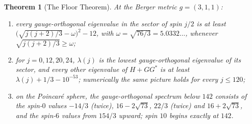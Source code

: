 \documentclass[11pt]{article}
\newtheorem{theorem}{Theorem}[section]
\theoremstyle{definition}
\theoremstyle{remark}
\begin{document}
\begin{theorem}[The Floor Theorem]\label{thm:gap}
At the Berger metric $g=(3,1,1)$:
\begin{enumerate}
  \item every gauge-orthogonal eigenvalue in the sector of spin $j/2$ is at least
    $\bigl(\sqrt{j(j+2)/3}-\omega\bigr)^2-12$, with $\omega=\sqrt{76/3}=5.0332\ldots$, whenever
    $\sqrt{j(j+2)/3}\ge\omega$;
  \item for $j=0,12,20,24$, $\lambda(j)$ is the lowest gauge-orthogonal eigenvalue of its sector, and
    every other eigenvalue of $H+GG^*$ is at least $\lambda(j)+1/3-10^{-53}$; numerically the same
    picture holds for every $j\le120$;
  \item on the Poincar\'e sphere, the gauge-orthogonal spectrum below $142$ consists of the spin-$0$
    values $-14/3$ (twice), $16-2\sqrt{73}$, $22/3$ (twice) and $16+2\sqrt{73}$, and the spin-$6$
    values from $154/3$ upward; spin $10$ begins exactly at $142$.
\end{enumerate}
\end{theorem}
\end{document}
